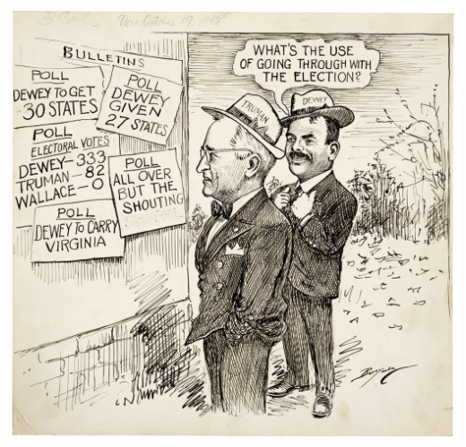 \documentclass[aspectratio=169]{beamer}
\theoremstyle{principle}
\begin{document}
\begin{frame}
\begin{columns}
\begin{column}{0.5\textwidth}
\begin{center}
\includegraphics[scale=0.25]{Truman-Dewey-polls-1948.jpg}
\end{center}
\end{column}
\end{columns}

\end{frame}
\end{document}
